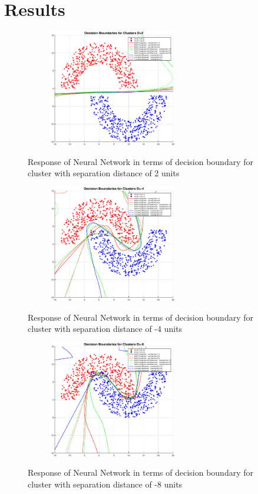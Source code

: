 \documentclass[conference]{IEEEtran}
\begin{document}
\section{Results}
\begin{figure}[h!]
\centering
{\includegraphics[width=3in,height=2in,clip,keepaspectratio]{Exp1_DB2.eps} }\\
\caption{Response of Neural Network in terms of decision boundary for cluster with separation distance of 2 units }
\end{figure}
\begin{figure}[h!]
\centering
{\includegraphics[width=3in,height=2in,clip,keepaspectratio]{Exp1_DBn4.eps} }\\
\caption{Response of Neural Network in terms of decision boundary for cluster with separation distance of -4 units}
\end{figure}
\begin{figure}[h!]
\centering
{\includegraphics[width=3in,height=2in,clip,keepaspectratio]{Exp1_DBn8.eps} }\\
\caption{Response of Neural Network in terms of decision boundary for cluster with separation distance of -8 units}
\end{figure}
\end{document}
